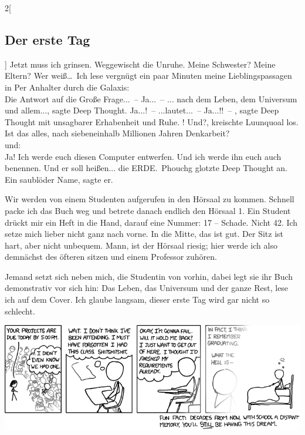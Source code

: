 \begin{multicols}{2}[\subsection{Der erste Tag}]
Jetzt muss ich grinsen. Weggewischt die Unruhe. Meine Schwester? Meine Eltern?
Wer weiß\dots\ Ich lese vergnügt ein paar Minuten meine Lieblingspassagen in
\glqq Per Anhalter durch die Galaxis\grqq: \\ \glqq \glq Die Antwort auf die
Große Frage...\grq\ -- \glq Ja...\grq\ -- \glq... nach dem Leben, dem Universum
und allem...\grq, sagte Deep Thought. \glq Ja...!\grq\ -- \glq...lautet...\grq\
-- \glq Ja...!!\grq\ -- \grq, sagte Deep Thought mit unsagbarer
Erhabenheit und Ruhe. \glq 42!  Und?\grq, kreischte Luunquoal los. \glq Ist das
alles, nach siebeneinhalb Millionen Jahren Denkarbeit?\grq\grqq\ \\ und: \\
\glqq \glq Ja!  Ich werde euch diesen Computer entwerfen. Und ich werde ihn
euch auch benennen.  Und er soll heißen... die ERDE.\grq\ Phouchg glotzte Deep
Thought an. \glq Ein saublöder Name\grq, sagte er.\grqq

Wir werden von einem Studenten aufgerufen in den Hörsaal zu kommen. Schnell
packe ich das Buch weg und betrete danach endlich den Hörsaal 1. Ein Student
drückt mir ein Heft in die Hand, darauf eine Nummer: 17 -- Schade. Nicht 42.
Ich setze mich lieber nicht ganz nach vorne. In die Mitte, das ist gut. Der
Sitz ist hart, aber nicht unbequem.  Mann, ist der Hörsaal riesig; hier werde
ich also demnächst des öfteren sitzen und einem Professor zuhören.

Jemand setzt sich neben mich, die Studentin von vorhin, dabei legt sie ihr Buch
demonstrativ vor sich hin: \glqq Das Leben, das Universum und der ganze
Rest\grqq, lese ich auf dem Cover.  Ich glaube langsam, dieser erste Tag wird
gar nicht so schlecht.

\begin{center}
\vfill\includegraphics[scale=0.45]{comics/557}
\end{center}

\end{multicols}
